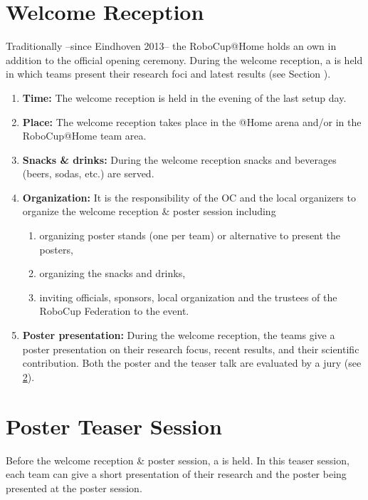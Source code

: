 \section{Welcome Reception}
\label{sec:welcome_reception}
Traditionally --since Eindhoven 2013-- the RoboCup@Home holds an own  in addition to the official opening ceremony. During the welcome reception, a  is held in which teams present their research foci and latest results (see Section ).
\begin{enumerate}
	\item \textbf{Time:} The welcome reception is held in the evening of the last setup day.
	\item \textbf{Place:} The welcome reception takes place in the @Home arena and/or in the RoboCup@Home team area.
	\item \textbf{Snacks \& drinks:} During the welcome reception snacks and beverages (beers, sodas, etc.) are served.
	\item \textbf{Organization:} It is the responsibility of the OC and the local organizers to organize the welcome reception \& poster session including
		\begin{enumerate}
			\item organizing poster stands (one per team) or alternative to present the posters,
			\item organizing the snacks and drinks,
			\item inviting officials, sponsors, local organization and the trustees of the RoboCup Federation to the event.
		\end{enumerate}
	\item \textbf{Poster presentation:} During the welcome reception, the teams give a poster presentation on their research focus, recent results, and their scientific contribution.
	Both the poster and the teaser talk are evaluated by a jury (see \ref{sec:poster_teaser_session}).
\end{enumerate}

\section{Poster Teaser Session}
\label{sec:poster_teaser_session}
Before the welcome reception \& poster session, a  is held. In this teaser session, each team can give a short presentation of their research and the poster being presented at the poster session.

